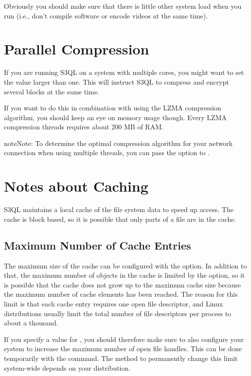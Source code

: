 \documentclass[letterpaper,10pt,english]{sphinxmanual}
\begin{document}
Obviously you should make sure that there is little other system load
when you run  (i.e., don't compile software or encode
videos at the same time).


\section{Parallel Compression}
\label{mount:parallel-compression}
If you are running S3QL on a system with multiple cores, you might
want to set the  value larger than one. This will
instruct S3QL to compress and encrypt several blocks at the same time.

If you want to do this in combination with using the LZMA compression
algorithm, you should keep an eye on memory usage though. Every
LZMA compression threads requires about 200 MB of RAM.

\begin{notice}{note}{Note:}
To determine the optimal compression algorithm for your network
connection when using multiple threads, you can pass the
 option to  .
\end{notice}


\section{Notes about Caching}
\label{mount:notes-about-caching}
S3QL maintains a local cache of the file system data to speed up
access. The cache is block based, so it is possible that only parts of
a file are in the cache.


\subsection{Maximum Number of Cache Entries}
\label{mount:maximum-number-of-cache-entries}
The maximum size of the cache can be configured with the 
option. In addition to that, the maximum number of objects in the
cache is limited by the  option, so it is
possible that the cache does not grow up to the maximum cache size
because the maximum number of cache elements has been reached. The
reason for this limit is that each cache entry requires one open
file descriptor, and Linux distributions usually limit the total
number of file descriptors per process to about a thousand.

If you specify a value for , you should therefore
make sure to also configure your system to increase the maximum number
of open file handles. This can be done temporarily with the 
command. The method to permanently change this limit system-wide
depends on your distribution.
\end{document}
